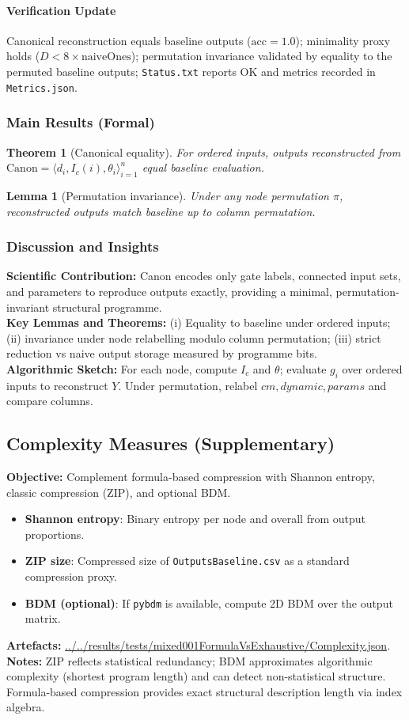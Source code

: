 \documentclass[11pt]{article}
\newtheorem{theorem}{Theorem}
\newtheorem{lemma}{Lemma}
\begin{document}
\paragraph{Verification Update} Canonical reconstruction equals baseline outputs (\(\mathrm{acc}=1.0\)); minimality proxy holds (\(D<8\times\mathrm{naiveOnes}\)); permutation invariance validated by equality to the permuted baseline outputs; \texttt{Status.txt} reports OK and metrics recorded in \texttt{Metrics.json}.
\subsubsection*{Main Results (Formal)}
\begin{theorem}[Canonical equality]
For ordered inputs, outputs reconstructed from \(\mathrm{Canon}=\langle d_i, I_c(i), \theta_i\rangle_{i=1}^n\) equal baseline evaluation.
\end{theorem}
\begin{lemma}[Permutation invariance]
Under any node permutation \(\pi\), reconstructed outputs match baseline up to column permutation.
\end{lemma}
\subsubsection*{Discussion and Insights}
\textbf{Scientific Contribution:} Canon encodes only gate labels, connected input sets, and parameters to reproduce outputs exactly, providing a minimal, permutation-invariant structural programme.\\
\textbf{Key Lemmas and Theorems:} (i) Equality to baseline under ordered inputs; (ii) invariance under node relabelling modulo column permutation; (iii) strict reduction vs naive output storage measured by programme bits.\\
\textbf{Algorithmic Sketch:} For each node, compute \(I_c\) and \(\theta\); evaluate \(g_i\) over ordered inputs to reconstruct \(Y\). Under permutation, relabel \(cm, dynamic, params\) and compare columns.

\subsection{Complexity Measures (Supplementary)}
\textbf{Objective:} Complement formula-based compression with Shannon entropy, classic compression (ZIP), and optional BDM.
\begin{itemize}
 \item \textbf{Shannon entropy}: Binary entropy per node and overall from output proportions.
 \item \textbf{ZIP size}: Compressed size of \texttt{OutputsBaseline.csv} as a standard compression proxy.
 \item \textbf{BDM (optional)}: If \texttt{pybdm} is available, compute 2D BDM over the output matrix.
\end{itemize}
\textbf{Artefacts:} \url{../../results/tests/mixed001FormulaVsExhaustive/Complexity.json}.\\
\textbf{Notes:} ZIP reflects statistical redundancy; BDM approximates algorithmic complexity (shortest program length) and can detect non-statistical structure. Formula-based compression provides exact structural description length via index algebra.
\end{document}
